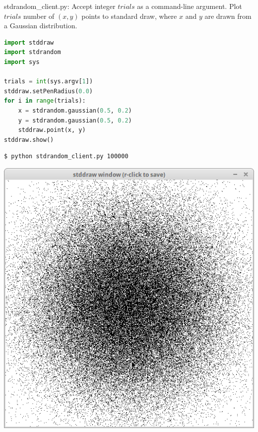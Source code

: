 \documentclass[8pt,a4paper,compress,handout]{beamer}
\begin{document}
\begin{frame}[fragile]
\begin{framed}
\tiny stdrandom\_client.py: Accept integer $trials$ as a command-line argument. Plot $trials$ number of $(x, y)$ points to standard draw, where $x$ and $y$ are drawn from a Gaussian distribution.
\end{framed}

\begin{lstlisting}[language=Python]
import stddraw
import stdrandom
import sys

trials = int(sys.argv[1])
stddraw.setPenRadius(0.0)
for i in range(trials):
    x = stdrandom.gaussian(0.5, 0.2)
    y = stdrandom.gaussian(0.5, 0.2)
    stddraw.point(x, y)
stddraw.show()
\end{lstlisting}

\begin{minipage}{160pt}
\begin{lstlisting}[language={}]
$ python stdrandom_client.py 100000
\end{lstlisting}
\end{minipage}%
\begin{minipage}{140pt}
\hfill \includegraphics[scale=0.17]{figures/stdrandom_client.png}
\end{minipage}
\end{frame}
\end{document}
